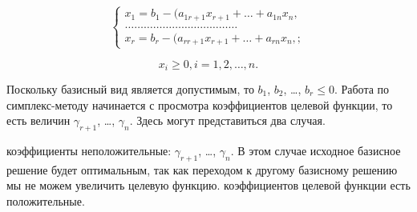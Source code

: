 \documentclass{article}
\begin{document}
\begin{equation*}
\begin{cases}
x_1 = b_1 - (a_{1r+1}x_{r+1} + \dots + a_{1n}x_n,\\
\dots\dots\dots\dots\dots\dots\dots\dots\dots\dots\dots\dots\\
x_r = b_r - (a_{rr+1}x_{r+1} + \dots + a_{rn}x_n,;
\end{cases}
\end{equation*}

$$x_i \geq 0, i=1,2,\dots,n.$$

Поскольку базисный вид является допустимым, то $b_1$, $b_2$, \dots, $b_r \leq 0$. Работа по симплекс-методу начинается с просмотра коэффициентов целевой функции, то есть величин $\gamma_{r+1}$, \dots, $\gamma_n$. Здесь могут представиться два случая.
		\begin{enumerate}
			\renewcommand{\theenumi}{(\arabic{enumi})}
			\renewcommand{\labelenumi}{\arabic{enumi})}
			 коэффициенты неположительные: $\gamma_{r+1}$, \dots, $\gamma_n$. В этом случае исходное базисное решение будет оптимальным, так как переходом к другому базисному решению мы не можем увеличить целевую функцию.
			 коэффициентов целевой функции есть положительные.
		\end{enumerate}
\end{document}
